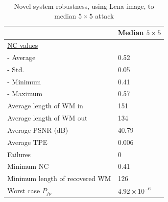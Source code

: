 \documentclass[12pt]{report}
\renewcommand{\baselinestretch}{1.5}
\begin{document}
\begin{table}[!ht]
\begin{center}
\renewcommand{\baselinestretch}{1.5}
\begin{tiny}
\begin{tabular}{|l|l|} \hline
& Median $5 \times 5$ \\ \hline
\underline{NC values} & \\
- Average & 0.52 \\ 
- Std. &  0.05 \\
- Minimum & 0.41 \\
- Maximum & 0.57 \\\hline
Average length of WM in &151 \\ \hline
Average length of WM out &134 \\ \hline
Average PSNR (dB) &40.79 \\ \hline
Average TPE & 0.006 \\ \hline 
Failures & 0	\\\hline\hline
Minimum NC & 0.41 \\ \hline 
Minimum length of recovered WM&126 \\ \hline
Worst case $P_{fp}$ &$4.92 \times 10^{-6}$ \\ \hline
\end{tabular}
\caption{Novel system robustness, using Lena image, to median $5 \times 5$ attack}
\label{strongResDI}
\end{tiny}
\end{center}
\end{table}
\end{document}
